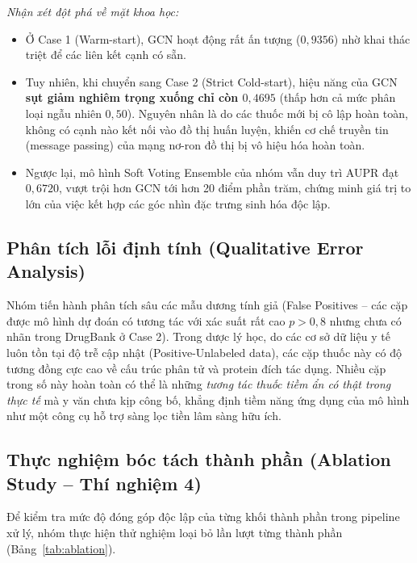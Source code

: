 \documentclass[12pt,a4paper,oneside]{report}
\begin{document}
\textit{Nhận xét đột phá về mặt khoa học:}
\begin{itemize}
  \item Ở Case 1 (Warm-start), GCN hoạt động rất ấn tượng ($0{,}9356$) nhờ khai thác triệt để các liên kết cạnh có sẵn.
  \item Tuy nhiên, khi chuyển sang Case 2 (Strict Cold-start), hiệu năng của GCN \textbf{sụt giảm nghiêm trọng xuống chỉ còn $0{,}4695$} (thấp hơn cả mức phân loại ngẫu nhiên $0{,}50$). Nguyên nhân là do các thuốc mới bị cô lập hoàn toàn, không có cạnh nào kết nối vào đồ thị huấn luyện, khiến cơ chế truyền tin (message passing) của mạng nơ-ron đồ thị bị vô hiệu hóa hoàn toàn.
  \item Ngược lại, mô hình Soft Voting Ensemble của nhóm vẫn duy trì AUPR đạt $0{,}6720$, vượt trội hơn GCN tới hơn 20 điểm phần trăm, chứng minh giá trị to lớn của việc kết hợp các góc nhìn đặc trưng sinh hóa độc lập.
\end{itemize}

\subsection{Phân tích lỗi định tính (Qualitative Error Analysis)}
Nhóm tiến hành phân tích sâu các mẫu dương tính giả (False Positives -- các cặp được mô hình dự đoán có tương tác với xác suất rất cao $p > 0{,}8$ nhưng chưa có nhãn trong DrugBank ở Case 2). Trong dược lý học, do các cơ sở dữ liệu y tế luôn tồn tại độ trễ cập nhật (Positive-Unlabeled data), các cặp thuốc này có độ tương đồng cực cao về cấu trúc phân tử và protein đích tác dụng. Nhiều cặp trong số này hoàn toàn có thể là những \textit{tương tác thuốc tiềm ẩn có thật trong thực tế} mà y văn chưa kịp công bố, khẳng định tiềm năng ứng dụng của mô hình như một công cụ hỗ trợ sàng lọc tiền lâm sàng hữu ích.

\subsection{Thực nghiệm bóc tách thành phần (Ablation Study -- Thí nghiệm 4)}
Để kiểm tra mức độ đóng góp độc lập của từng khối thành phần trong pipeline xử lý, nhóm thực hiện thử nghiệm loại bỏ lần lượt từng thành phần (Bảng~\ref{tab:ablation}).
\end{document}
